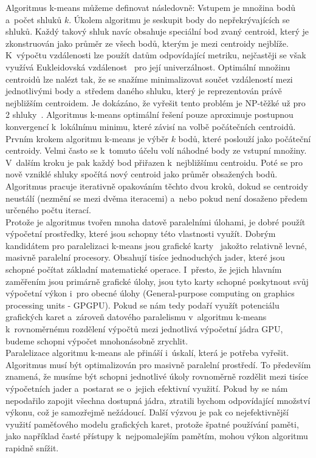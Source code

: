 Algoritmus k-means můžeme definovat následovně: Vstupem je množina bodů a~počet shluků $k$. Úkolem algoritmu je seskupit body do nepřekrývajících se shluků. Každý takový shluk navíc obsahuje speciální bod zvaný centroid, který je zkonstruován jako průměr ze všech bodů, kterým je mezi centroidy nejblíže. K~výpočtu vzdálenosti lze použít datům odpovídající metriku, nejčastěji se však využívá Eukleidovská vzdálenost~\cite{Zechner09} pro její univerzálnost. Optimální množinu centroidů lze nalézt tak, že se snažíme minimalizovat součet vzdáleností mezi jednotlivými body a~středem daného shluku, který je reprezentován právě nejbližším centroidem. Je dokázáno, že vyřešit tento problém je NP-těžké už pro 2 shluky~\cite{Drineas04}. Algoritmus k-means optimální řešení pouze aproximuje postupnou konvergencí k~lokálnímu minimu, které závisí na volbě počátečních centroidů.\\

Prvním krokem algoritmu k-means je výběr $k$ bodů, které poslouží jako počáteční centroidy. Velmi často se k~tomuto účelu volí náhodné body ze vstupní množiny. V~dalším kroku je pak každý bod přiřazen k~nejbližšímu centroidu. Poté se pro nově vzniklé shluky spočítá nový centroid jako průměr obsažených bodů. Algoritmus pracuje iterativně opakováním těchto dvou kroků, dokud se centroidy neustálí (nezmění se mezi dvěma iteracemi) a~nebo pokud není dosaženo předem určeného počtu iterací.\\

Protože je algoritmus tvořen mnoha datově paralelními úlohami, je dobré použít výpočetní prostředky, které jsou schopny této vlastnosti využít.
Dobrým kandidátem pro paralelizaci k-means jsou grafické karty~\cite{Zechner09} jakožto relativně levné, masivně paralelní procesory. Obsahují tisíce jednoduchých jader, které jsou schopné počítat základní matematické operace. I~přesto, že jejich hlavním zaměřením jsou primárně grafické úlohy, jsou tyto karty schopné poskytnout svůj výpočetní výkon i~pro obecné úlohy (General-purpose computing on graphics processing units - GPGPU). Pokud se nám tedy podaří využít potenciálu grafických karet a~zároveň datového paralelismu v~algoritmu k-means k~rovnoměrnému rozdělení výpočtů mezi jednotlivá výpočetní jádra GPU, budeme schopni výpočet mnohonásobně zrychlit.\\

Paralelizace algoritmu k-means ale přináší i~úskalí, která je potřeba vyřešit. Algoritmus musí být optimalizován pro masivně paralelní prostředí. To především znamená, že musíme být schopni jednotlivé úkoly rovnoměrně rozdělit mezi tisíce výpočetních jader a~postarat se o~jejich efektivní využití. Pokud by se nám nepodařilo zapojit všechna dostupná jádra, ztratili bychom odpovídající množství výkonu, což je samozřejmě nežádoucí. Další výzvou je pak co nejefektivnější využití paměťového modelu grafických karet, protože špatné používání paměti, jako na\-pří\-klad časté přístupy k~nejpomalejším pamětím, mohou výkon algoritmu rapidně snížit.\\

